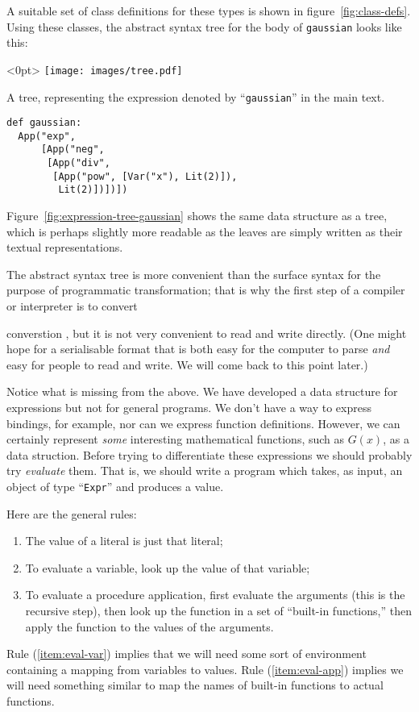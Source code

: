\documentclass[11pt, a4paper]{article}
\newcommand{\cd}[1]{\texttt{#1}}
\begin{document}
A suitable set of class definitions for these types is shown in
figure~\ref{fig:class-defs}. Using these classes, the abstract syntax
tree for the body of \cd{gaussian} looks like this:
\begin{marginfigure}<0pt>
  \centering
  \texttt{[image: images/tree.pdf]}
  \caption{A tree, representing the expression denoted by
    ``\cd{gaussian}'' in the main text.\label{fig:expression-tree-gaussian}}
\end{marginfigure}
\begin{verbatim}
def gaussian:
  App("exp",
      [App("neg",
       [App("div",
        [App("pow", [Var("x"), Lit(2)]),
         Lit(2)])])])
\end{verbatim}
Figure~\ref{fig:expression-tree-gaussian} shows the same data
structure as a tree, which is perhaps slightly more
readable as the leaves are simply written as their textual
representations.

The abstract syntax tree is more convenient than the surface syntax
for the purpose of programmatic transformation; that is why
the first step of a compiler or interpreter is to convert

converstion , but it is not very
convenient to read and write directly. (One might hope for a
serialisable format that is both easy for the computer to parse
\emph{and} easy for people to read and write. We will come back to
this point later.)

Notice what is missing from the above. We have developed a data
structure for expressions but not for general programs. We don't have
a way to express bindings, for example, nor can we express function
definitions. However, we can certainly represent \emph{some}
interesting mathematical functions, such as $G(x)$, as a data
struction. Before trying to differentiate these expressions we should
probably try \emph{evaluate} them. That is, we should write a program
which takes, as input, an object of type ``\cd{Expr}'' and produces a
value.

Here are the general rules:
\begin{enumerate}
\item The value of a literal is just that literal;
\item To evaluate a variable, look up the value of that variable;\label{item:eval-var}
\item To evaluate a procedure application, first evaluate the
  arguments (this is the recursive step), then look up the function
  in a set of ``built-in functions,'' then apply the function to the
  values of the arguments.\label{item:eval-app}
\end{enumerate}

Rule (\ref{item:eval-var}) implies that we will need some sort of
environment containing a mapping from variables to values. Rule
(\ref{item:eval-app}) implies we will need something similar to map
  the names of built-in functions to actual functions.
\end{document}
